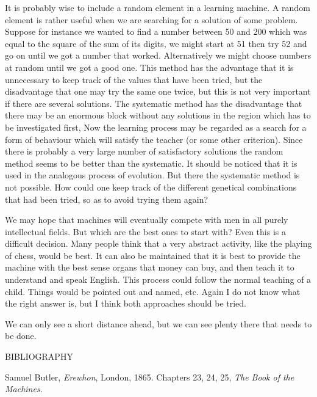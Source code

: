 \documentclass[10pt]{article} %
\begin{document}
It is probably wise to include a random element in a learning machine. A random element is rather useful when we are searching for a solution of some problem. Suppose for instance we wanted to find a number between 50 and 200 which was equal to the square of the sum of its digits, we might start at 51 then try 52 and go on until we got a number that worked. Alternatively we might choose numbers at random until we got a good one. This method has the advantage that it is unnecessary to keep track of the values that have been tried, but the disadvantage that one may try the same one twice, but this is not very important if there are several solutions. The systematic method has the disadvantage that there may be an enormous block without any solutions in the region which has to be investigated first, Now the learning process may be regarded as a search for a form of behaviour which will satisfy the teacher (or some other criterion). Since there is probably a very large number of satisfactory solutions the random method seems to be better than the systematic. It should be noticed that it is used in the analogous process of evolution. But there the systematic method is not possible. How could one keep track of the different genetical combinations that had been tried, so as to avoid trying them again?

We may hope that machines will eventually compete with men in all purely intellectual fields. But which are the best ones to start with? Even this is a difficult decision. Many people think that a very abstract activity, like the playing of chess, would be best. It can also be maintained that it is best to provide the machine with the best sense organs that money can buy, and then teach it to understand and speak English. This process could follow the normal teaching of a child. Things would be pointed out and named, etc. Again I do not know what the right answer is, but I think both approaches should be tried.

We can only see a short distance ahead, but we can see plenty there that needs to be done.

\par\vspace{0.5cm}%
\begin{center}
  \normalfont\textsc{BIBLIOGRAPHY}
\end{center}%

\noindent Samuel Butler, \textit{Erewhon}, London, 1865. Chapters 23, 24, 25, \textit{The Book of the Machines}.\par
\vspace{0.5\baselineskip}
\end{document}
